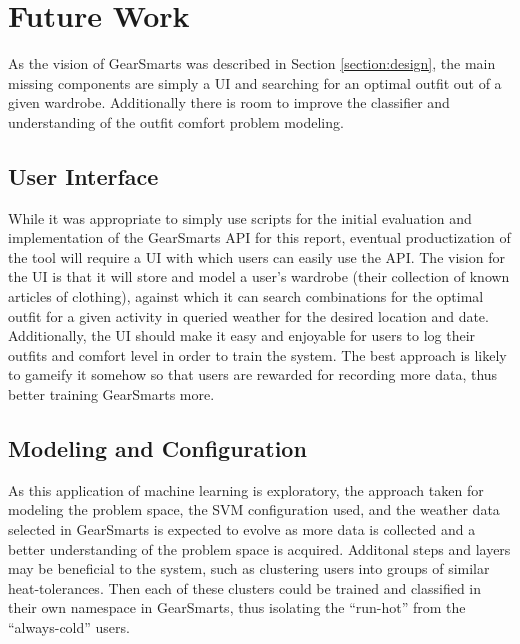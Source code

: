 \section{Future Work}
\label{section:futurework}
As the vision of GearSmarts was described in Section \ref{section:design}, the main missing components are simply a UI
and searching for an optimal outfit out of a given wardrobe. Additionally there is room to improve the classifier and
understanding of the outfit comfort problem modeling.

\subsection{User Interface}
\label{section:ui}
While it was appropriate to simply use scripts for the initial evaluation and implementation of the GearSmarts API for
this report, eventual productization of the tool will require a UI with which users can easily use the API. The vision
for the UI is that it will store and model a user's wardrobe (their collection of known articles of clothing), against
which it can search combinations for the optimal outfit for a given activity in queried weather for the desired location
and date. Additionally, the UI should make it easy and enjoyable for users to log their outfits and comfort level in order
to train the system. The best approach is likely to gameify it somehow so that users are rewarded for recording more
data, thus better training GearSmarts more.

\subsection{Modeling and Configuration}
\label{section:modelingandconfig}
As this application of machine learning is exploratory, the approach taken for modeling the problem space, the
SVM configuration used, and the weather data selected in GearSmarts is expected to evolve as more data is collected and
a better understanding of the problem space is acquired. Additonal steps and layers may be beneficial to the system, such
as clustering users into groups of similar heat-tolerances. Then each of these clusters could be trained and classified in
their own namespace in GearSmarts, thus isolating the ``run-hot'' from the ``always-cold'' users. 